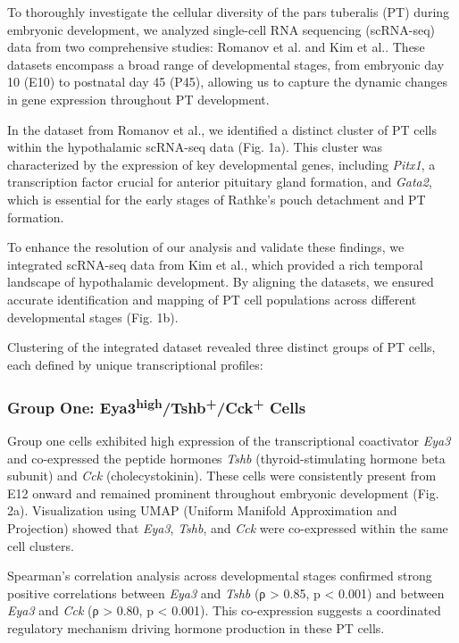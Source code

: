 \documentclass[
  number,
  preprint]{elsarticle}
\begin{document}
To thoroughly investigate the cellular diversity of the pars tuberalis
(PT) during embryonic development, we analyzed single-cell RNA
sequencing (scRNA-seq) data from two comprehensive studies: Romanov et
al.\citep{romanovMolecularDesignHypothalamus2020} and Kim et
al.\citep{kim2020}. These datasets encompass a broad range of
developmental stages, from embryonic day 10 (E10) to postnatal day 45
(P45), allowing us to capture the dynamic changes in gene expression
throughout PT development.

In the dataset from Romanov et al., we identified a distinct cluster of
PT cells within the hypothalamic scRNA-seq data (Fig. 1a). This cluster
was characterized by the expression of key developmental genes,
including \emph{Pitx1}, a transcription factor crucial for anterior
pituitary gland
formation\citep{szetoPOTXPIT1interactingHomeodomain1996}, and
\emph{Gata2}, which is essential for the early stages of Rathke's pouch
detachment and PT formation\citep{dasenReciprocalInteractionsPit11999}.

To enhance the resolution of our analysis and validate these findings,
we integrated scRNA-seq data from Kim et al., which provided a rich
temporal landscape of hypothalamic development. By aligning the
datasets, we ensured accurate identification and mapping of PT cell
populations across different developmental stages (Fig. 1b).

Clustering of the integrated dataset revealed three distinct groups of
PT cells, each defined by unique transcriptional profiles:

\subsubsection{\texorpdfstring{\textbf{Group One:
Eya3\textsuperscript{high}/Tshb\textsuperscript{+}/Cck\textsuperscript{+}
Cells}}{Group One: Eya3high/Tshb+/Cck+ Cells}}\label{group-one-eya3hightshbcck-cells}

Group one cells exhibited high expression of the transcriptional
coactivator \emph{Eya3} and co-expressed the peptide hormones
\emph{Tshb} (thyroid-stimulating hormone beta subunit) and \emph{Cck}
(cholecystokinin). These cells were consistently present from E12 onward
and remained prominent throughout embryonic development (Fig. 2a).
Visualization using UMAP (Uniform Manifold Approximation and Projection)
showed that \emph{Eya3}, \emph{Tshb}, and \emph{Cck} were co-expressed
within the same cell clusters.

Spearman's correlation analysis across developmental stages confirmed
strong positive correlations between \emph{Eya3} and \emph{Tshb} (ρ
\textgreater{} 0.85, p \textless{} 0.001) and between \emph{Eya3} and
\emph{Cck} (ρ \textgreater{} 0.80, p \textless{} 0.001). This
co-expression suggests a coordinated regulatory mechanism driving
hormone production in these PT cells.
\end{document}
